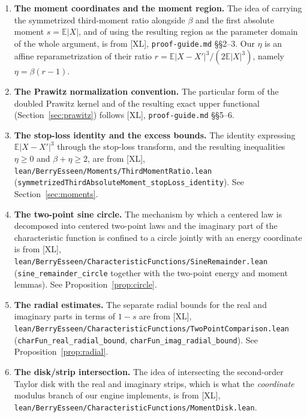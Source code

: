 \documentclass[11pt,a4paper]{article}
\theoremstyle{definition}
\newcommand{\EE}{\mathbb{E}}
\newcommand{\Lean}[1]{\texttt{#1}}
\newcommand{\file}[1]{\texttt{#1}}
\begin{document}
\begin{enumerate}[label=(\roman*),leftmargin=2.4em]
\item \textbf{The moment coordinates and the moment region.} The idea of
  carrying the symmetrized third-moment ratio alongside $\beta$ and the first
  absolute moment $s=\EE|X|$, and of using the resulting region as the parameter
  domain of the whole argument, is from [XL], \file{proof-guide.md}
  \S\S2--3. Our $\eta$ is an affine reparametrization of their ratio
  $r=\EE|X-X'|^3/(2\EE|X|^3)$, namely $\eta=\beta(r-1)$.

\item \textbf{The Prawitz normalization convention.} The particular form of the
  doubled Prawitz kernel and of the resulting exact upper functional
  (Section~\ref{sec:prawitz}) follows [XL], \file{proof-guide.md} \S\S5--6.

\item \textbf{The stop-loss identity and the excess bounds.} The identity
  expressing $\EE|X-X'|^3$ through the stop-loss transform, and the resulting
  inequalities $\eta\ge0$ and $\beta+\eta\ge2$, are from [XL],
  \file{lean/BerryEsseen/Moments/ThirdMomentRatio.lean}
  (\Lean{symmetrizedThirdAbsoluteMoment\_stopLoss\_identity}). See
  Section~\ref{sec:moments}.

\item \textbf{The two-point sine circle.} The mechanism by which a centered law
  is decomposed into centered two-point laws and the imaginary part of the
  characteristic function is confined to a circle jointly with an energy
  coordinate is from [XL],
  \file{lean/BerryEsseen/CharacteristicFunctions/SineRemainder.lean}
  (\Lean{sine\_remainder\_circle} together with the two-point energy and moment
  lemmas). See Proposition~\ref{prop:circle}.

\item \textbf{The radial estimates.} The separate radial bounds for the real and
  imaginary parts in terms of $1-s$ are from [XL],
  \file{lean/BerryEsseen/CharacteristicFunctions/TwoPointComparison.lean}
  (\Lean{charFun\_real\_radial\_bound}, \Lean{charFun\_imag\_radial\_bound}).
  See Proposition~\ref{prop:radial}.

\item \textbf{The disk/strip intersection.} The idea of intersecting the
  second-order Taylor disk with the real and imaginary strips, which is what the
  \emph{coordinate} modulus branch of our engine implements, is from [XL],
  \file{lean/BerryEsseen/CharacteristicFunctions/MomentDisk.lean}.


\end{enumerate}
\end{document}
